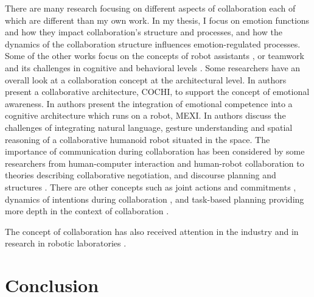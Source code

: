 \documentclass[11pt]{article}
\begin{document}
There are many research focusing
on different aspects of collaboration each of which are different than my own
work. In my thesis, I focus on emotion functions and how they impact
collaboration's structure and processes, and how the dynamics of the
collaboration structure influences emotion-regulated processes. Some of the
other works focus on the concepts of robot assistants
\cite{clancey:agent-assistants-collaboration}, or teamwork and its challenges in
cognitive and behavioral levels \cite{cohen:teamwork,
nikolaidis:collaboration-joint-action, scerri:prototype-distributed-teams,
tambe:flexible-teamwork}. Some researchers have an overall look at a
collaboration concept at the architectural level. In
\cite{garcia:collaboration-emotional-awareness} authors present a collaborative
architecture, COCHI, to support the concept of emotional awareness. In
\cite{esau:integrating-emotion-collaboration} authors present the integration of
emotional competence into a cognitive architecture which runs on a robot, MEXI.
In \cite{sofge:collaboration-humanoid-space} authors discuss the challenges of
integrating natural language, gesture understanding and spatial reasoning of a
collaborative humanoid robot situated in the space. The importance of
communication during collaboration has been considered by some researchers from
human-computer interaction and human-robot collaboration
\cite{clair:action-intention-collaboraiton,
matignon:verbal-nonverbal-collaboration, rich:discourse} to theories describing
collaborative negotiation, and discourse planning and structures
\cite{andriessen:disourse-planning, grosz:discourse-structure,
sidner:discourse-collaborative-negotiation}. There are other concepts such as
joint actions and commitments \cite{grosz:intention-dynamics-collaboration},
dynamics of intentions during collaboration \cite{levesque:acting-together}, and
task-based planning providing more depth in the context of collaboration
\cite{burghart:cognitive-architecture-robot, rich:cea}.

The concept of collaboration has also received attention in the industry and in
research in robotic laboratories \cite{green:collaboration-literature-review}.

\section{Conclusion}



\end{document}
